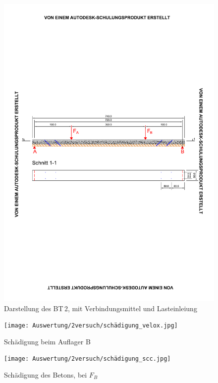 \begin{figure}[h!]
\begin{center}
\includegraphics[scale =0.9,trim= 1.5cm 10cm 1.5cm 10cm, clip=true]{Auswertung/2versuch/BT2.pdf}
\caption{Darstellung des BT\,2, mit Verbindungsmittel und Lasteinleiung}
\label{1versuch}
\end{center}
\end{figure}



\begin{figure}[h]
\begin{minipage}[hbt]{7cm}	
	\texttt{[image: Auswertung/2versuch/schädigung\_velox.jpg]}
	\caption{Schädigung beim Auflager B}
	\label{schädigung velox}
\end{minipage}
\hfill
\begin{minipage}[hbt]{7cm}
	\texttt{[image: Auswertung/2versuch/schädigung\_scc.jpg]}
	\caption{Schädigung des Betons, bei $F_{B}$}
	\label{schädigung scc}
\end{minipage}
\end{figure}


